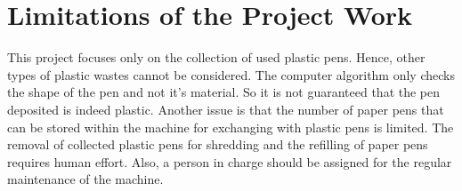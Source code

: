 \section{Limitations of the Project Work}

This project focuses only on the collection of used plastic pens. Hence, other types of plastic wastes cannot be considered. The computer algorithm only checks the shape of the pen and not it's material. So it is not guaranteed that the pen deposited is indeed plastic. Another issue is that the number of paper pens that can be stored within the machine for exchanging with plastic pens is limited. The removal of collected plastic pens for shredding and the refilling of paper pens requires human effort. Also, a person in charge should be assigned for the regular maintenance of the machine.


